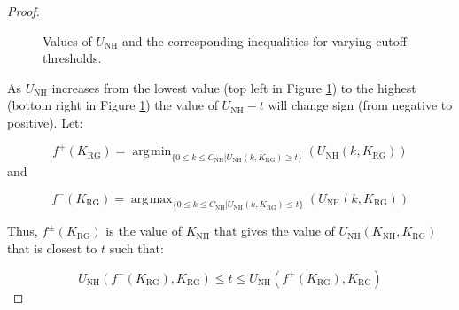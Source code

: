 \documentclass{article}
\newcommand{\NH}{\text{NH}}
\newcommand{\RG}{\text{RG}}
\DeclareMathOperator*{\argmin}{arg\!min}
\DeclareMathOperator*{\argmax}{arg\!max}
\begin{document}
\begin{proof}
\begin{figure}[!hbtp]
\begin{center}
    \end{center}
    \caption{Values of \(U_{\NH}\) and the corresponding inequalities for varying cutoff thresholds.}\label{fig:variation_of_UNH}
\end{figure}

As \(U_{\NH}\) increases from the lowest value (top left in Figure  \ref{fig:variation_of_UNH}) to the highest (bottom right in Figure \ref{fig:variation_of_UNH}) the value of \(U_{\NH}-t\) will change sign (from negative to positive).
Let:

\begin{equation}
f^+(K_{\RG})=\argmin_{\{0\leq k \leq C_{\NH}|U_{\NH}(k, K_{\RG})\geq t\}}(U_{\NH}(k, K_{\RG}))
\end{equation}
 and

\begin{equation}
f^-(K_{\RG})=\argmax_{\{0\leq k \leq C_{\NH}|U_{\NH}(k, K_{\RG})\leq t\}}(U_{\NH}(k, K_{\RG}))
\end{equation}

Thus, \(f^{\pm}({K_{\RG}})\) is the value of \(K_{\NH}\) that gives the value of \(U_{\NH}(K_{\NH}, K_{\RG})\) that is closest to \(t\) such that:

\begin{equation}
U_{\NH}(f^-(K_{\RG}),K_{\RG})\leq t \leq U_{\NH}(f^+(K_{\RG}),K_{\RG})
\end{equation}


\end{proof}
\end{document}
